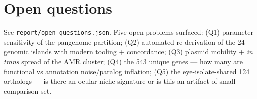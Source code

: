 \documentclass[11pt]{article}
\begin{document}
\section{Open questions}
See \texttt{report/open\_questions.json}. Five open problems surfaced: (Q1) parameter
sensitivity of the pangenome partition; (Q2) automated re-derivation of the 24 genomic
islands with modern tooling + concordance; (Q3) plasmid mobility + \textit{in trans} spread
of the AMR cluster; (Q4) the 543 unique genes --- how many are functional vs annotation
noise/paralog inflation; (Q5) the eye-isolate-shared 124 orthologs --- is there an
ocular-niche signature or is this an artifact of small comparison set.
\end{document}
